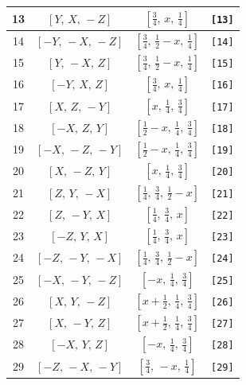 \documentclass[fleqn,8pt]{jsarticle}
\begin{document}
\begin{longtable}{cccc}
13 & $\left[ Y,\, X,\, - Z \right]$ & $\left[ \frac{3}{4},\, x,\, \frac{1}{4} \right]$ & {\tt [13]} \\ \hline
14 & $\left[ - Y,\, - X,\, - Z \right]$ & $\left[ \frac{3}{4},\, \frac{1}{2} - x,\, \frac{1}{4} \right]$ & {\tt [14]} \\ \hline
15 & $\left[ Y,\, - X,\, Z \right]$ & $\left[ \frac{3}{4},\, \frac{1}{2} - x,\, \frac{1}{4} \right]$ & {\tt [15]} \\ \hline
16 & $\left[ - Y,\, X,\, Z \right]$ & $\left[ \frac{3}{4},\, x,\, \frac{1}{4} \right]$ & {\tt [16]} \\ \hline
17 & $\left[ X,\, Z,\, - Y \right]$ & $\left[ x,\, \frac{1}{4},\, \frac{3}{4} \right]$ & {\tt [17]} \\ \hline
18 & $\left[ - X,\, Z,\, Y \right]$ & $\left[ \frac{1}{2} - x,\, \frac{1}{4},\, \frac{3}{4} \right]$ & {\tt [18]} \\ \hline
19 & $\left[ - X,\, - Z,\, - Y \right]$ & $\left[ \frac{1}{2} - x,\, \frac{1}{4},\, \frac{3}{4} \right]$ & {\tt [19]} \\ \hline
20 & $\left[ X,\, - Z,\, Y \right]$ & $\left[ x,\, \frac{1}{4},\, \frac{3}{4} \right]$ & {\tt [20]} \\ \hline
21 & $\left[ Z,\, Y,\, - X \right]$ & $\left[ \frac{1}{4},\, \frac{3}{4},\, \frac{1}{2} - x \right]$ & {\tt [21]} \\ \hline
22 & $\left[ Z,\, - Y,\, X \right]$ & $\left[ \frac{1}{4},\, \frac{3}{4},\, x \right]$ & {\tt [22]} \\ \hline
23 & $\left[ - Z,\, Y,\, X \right]$ & $\left[ \frac{1}{4},\, \frac{3}{4},\, x \right]$ & {\tt [23]} \\ \hline
24 & $\left[ - Z,\, - Y,\, - X \right]$ & $\left[ \frac{1}{4},\, \frac{3}{4},\, \frac{1}{2} - x \right]$ & {\tt [24]} \\ \hline
25 & $\left[ - X,\, - Y,\, - Z \right]$ & $\left[ - x,\, \frac{1}{4},\, \frac{3}{4} \right]$ & {\tt [25]} \\ \hline
26 & $\left[ X,\, Y,\, - Z \right]$ & $\left[ x + \frac{1}{2},\, \frac{1}{4},\, \frac{3}{4} \right]$ & {\tt [26]} \\ \hline
27 & $\left[ X,\, - Y,\, Z \right]$ & $\left[ x + \frac{1}{2},\, \frac{1}{4},\, \frac{3}{4} \right]$ & {\tt [27]} \\ \hline
28 & $\left[ - X,\, Y,\, Z \right]$ & $\left[ - x,\, \frac{1}{4},\, \frac{3}{4} \right]$ & {\tt [28]} \\ \hline
29 & $\left[ - Z,\, - X,\, - Y \right]$ & $\left[ \frac{3}{4},\, - x,\, \frac{1}{4} \right]$ & {\tt [29]} \\ \hline

\end{longtable}
\end{document}
